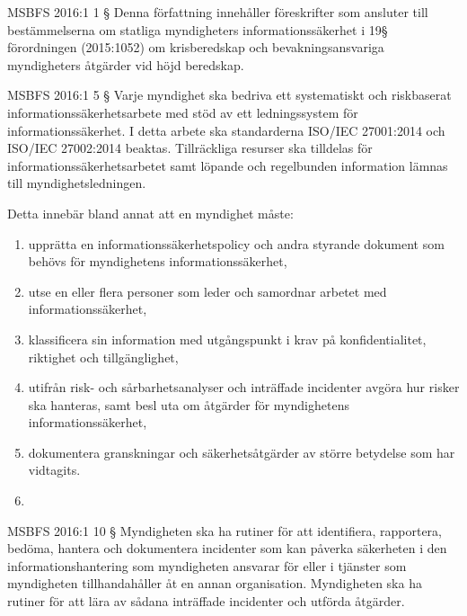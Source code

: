 \documentclass{beamer}
\begin{document}
\begin{frame}{MSBFS 2016:1}
  1 §  Denna författning innehåller föreskrifter som ansluter till
  bestämmelserna om statliga myndigheters informationssäkerhet i 19§
  förordningen (2015:1052) om krisberedskap och bevakningsansvariga
  myndigheters åtgärder vid höjd beredskap. 
\end{frame}

\begin{frame}{MSBFS 2016:1}
  5 §  Varje myndighet ska bedriva ett systematiskt och riskbaserat
  informationssäkerhetsarbete med stöd av ett ledningssystem för
  informationssäkerhet. I detta arbete ska standarderna ISO/IEC 27001:2014 och
  ISO/IEC 27002:2014 beaktas. Tillräckliga resurser ska tilldelas för
  informationssäkerhetsarbetet samt löpande och regelbunden information lämnas
  till myndighetsledningen.

  Detta innebär bland annat att en myndighet måste:
  \begin{enumerate}
    \item upprätta en informationssäkerhetspolicy och andra styrande dokument
      som behövs för myndighetens informationssäkerhet,
    \item utse en eller flera personer som leder och samordnar arbetet med
      informationssäkerhet,
    \item klassificera sin information med utgångspunkt i krav på
      konfidentialitet, riktighet och tillgänglighet,
    \item utifrån risk- och sårbarhetsanalyser och inträffade incidenter
      avgöra hur risker ska hanteras, samt besl uta om åtgärder för
      myndighetens informationssäkerhet,
    \item dokumentera granskningar och säkerhetsåtgärder av större betydelse
      som har vidtagits.
    \item
  \end{enumerate}
\end{frame}

\begin{frame}{MSBFS 2016:1}
  10 § Myndigheten ska ha rutiner för att identifiera, rapportera, bedöma,
  hantera och dokumentera incidenter som kan påverka säkerheten i den
  informationshantering som myndigheten ansvarar för eller i tjänster som
  myndigheten tillhandahåller åt en annan organisation. Myndigheten ska ha
  rutiner för att lära av sådana inträffade incidenter och utförda åtgärder.
\end{frame}
\end{document}
